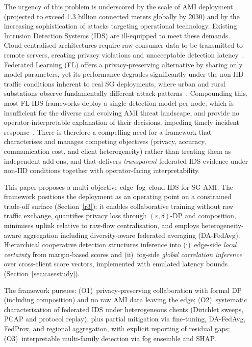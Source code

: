 \documentclass[sensors,article,submit,pdftex,moreauthors]{Definitions/mdpi}
\begin{document}
The urgency of this problem is underscored by the scale of AMI deployment (projected to exceed 1.3 billion connected meters globally by 2030) and by the increasing sophistication of attacks targeting operational technology. Existing Intrusion Detection Systems (IDS) are ill-equipped to meet these demands. Cloud-centralised architectures require raw consumer data to be transmitted to remote servers, creating privacy violations and unacceptable detection latency~\cite{hamdi2025investigating, buyuktanir2025federated}. Federated Learning (FL) offers a privacy-preserving alternative by sharing only model parameters, yet its performance degrades significantly under the non-IID traffic conditions inherent to real SG deployments, where urban and rural substations observe fundamentally different attack patterns~\cite{alshamasi2025federated, fdla_dc_microgrids}. Compounding this, most FL-IDS frameworks deploy a single detection model per node, which is insufficient for the diverse and evolving AMI threat landscape, and provide no operator-interpretable explanation of their decisions, impeding timely incident response~\cite{naeem2025classification, hamdi2025hybrid}. There is therefore a compelling need for a framework that characterises and manages competing objectives (privacy, accuracy, communication cost, and client heterogeneity) rather than treating them as independent add-ons, and that delivers \textit{transparent} federated IDS evidence under non-IID conditions together with operator-facing interpretability.

This paper proposes a multi-objective edge--fog--cloud IDS for SG AMI. The framework positions the deployment as an operating point on a constrained trade-off surface (Section~\ref{r3}): it enables collaborative training without raw traffic exchange, quantifies privacy loss through $(\varepsilon,\delta)$-DP and composition, minimises uplink relative to raw-flow centralisation, and employs heterogeneity-aware aggregation including diversity-aware federated averaging (DA-FedAvg). Hierarchical cooperative detection structures inference into (i)~edge-side \textit{local certainty} from margin-based scores and (ii)~fog-side \textit{global correlation inference} over cross-client score vectors, implemented with emulated latency bounds (Section~\ref{sec:casestudy}).

The framework pursues: (O1)~privacy-preserving collaboration with formal DP (including composition) and no raw AMI data leaving the edge; (O2)~systematic characterisation of federated IDS under heterogeneous clients (Dirichlet sweeps, PCAP and protocol replay), plus partial mitigation via fine-tuning, DA-FedAvg, FedProx, and regional aggregation, with explicit reporting of residual gaps; (O3)~interpretable multi-family detection via fog ensemble and SHAP.
\end{document}
